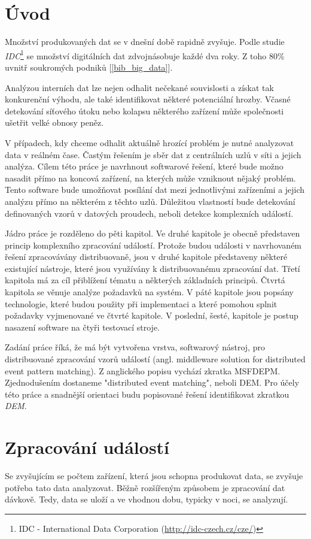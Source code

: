 \documentclass[
  digital, %
  table,   %
  nolof,     %
  nolot,     %
  oneside, %
  nocover,
  monochrome,
  12pt
]{fithesis3}
\begin{document}
\chapter{Úvod}
Množství produkovaných dat se v dnešní době rapidně zvyšuje. Podle studie \textit{IDC}\footnote{IDC - International Data Corporation (\url{http://idc-czech.cz/cze/})} se množství digitálních dat zdvojnásobuje každé dva roky. Z toho 80\% uvnitř soukromých podniků [\ref{bib_big_data}].

Analýzou interních dat lze nejen odhalit nečekané souvislosti a získat tak konkurenční výhodu, ale také identifikovat některé potenciální hrozby. Včasné detekování síťového útoku nebo kolapsu některého zařízení může společnosti ušetřit velké obnosy peněz.

V případech, kdy chceme odhalit aktuálně hrozící problém je nutné analyzovat data v reálném čase. Častým řešením je sběr dat z centrálních uzlů v síti a jejich analýza. Cílem této práce je navrhnout softwarové řešení, které bude možno nasadit přímo na koncová zařízení, na kterých může vzniknout nějaký problém. Tento software bude umožňovat posílání dat mezi jednotlivými zařízeními a jejich analýzu přímo na některém z těchto uzlů. Důležitou vlastností bude detekování definovaných vzorů v datových proudech, neboli detekce komplexních událostí.

Jádro práce je rozděleno do pěti kapitol. Ve druhé kapitole je obecně představen princip komplexního zpracování událostí. Protože budou události v navrhovaném řešení zpracovávány distribuovaně, jsou v druhé kapitole představeny některé existující nástroje, které jsou využívány k distribuovanému zpracování dat. Třetí kapitola má za cíl přiblížení tématu a některých základních principů. Čtvrtá kapitola se věnuje analýze požadavků na systém. V páté kapitole jsou popsány technologie, které budou použity při implementaci a které pomohou splnit požadavky vyjmenované ve čtvrté kapitole. V poslední, šesté, kapitole je postup nasazení software na čtyři testovací stroje.

Zadání práce říká, že má být vytvořena vrstva, softwarový nástroj, pro distribuované zpracování vzorů událostí (angl. middleware solution for distributed event pattern matching). Z anglického popisu vychází zkratka MSFDEPM. Zjednodušením dostaneme "distributed event matching", neboli DEM. Pro účely této práce a snadnější orientaci budu popisované řešení identifikovat zkratkou \textit{DEM}.

\chapter{Zpracování událostí}
Se zvyšujícím se počtem zařízení, která jsou schopna produkovat data, se zvyšuje potřeba tato data analyzovat. Běžně rozšířeným způsobem je zpracování dat dávkově. Tedy, data se uloží a ve vhodnou dobu, typicky v noci, se analyzují.
\end{document}

